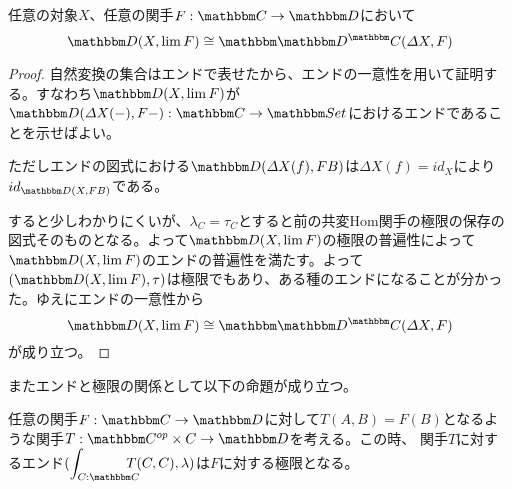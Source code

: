 \begin{prop}\label{prop-def-limit-by-arrowset}
  任意の対象$X$、任意の関手$\functor{F}{C}{D}$において\[\arset{D}{X}{\lim F}\cong\arset{\funccat{C}{D}}{\varDelta X}{F}\]
\end{prop}
\begin{proof}
  自然変換の集合はエンドで表せたから、エンドの一意性を用いて証明する。すなわち$\arset{D}{X}{\lim F}$が$\functor{\arset{D}{\varDelta X (-)}{F-}}{C}{Set}$におけるエンドであることを示せばよい。
  \begin{center}
  \end{center}
  ただしエンドの図式における$\arset{D}{\varDelta X(f)}{FB}$は$\varDelta X(f)=id_X$により$id_{\arset{D}{X}{FB}}$である。
  
  すると少しわかりにくいが、$\lambda_C=\tau_C$とすると前の共変Hom関手の極限の保存の図式そのものとなる。よって$\arset{D}{X}{\lim F}$の極限の普遍性によって$\arset{D}{X}{\lim F}$のエンドの普遍性を満たす。よって$(\arset{D}{X}{\lim F}, \tau)$は極限でもあり、ある種のエンドになることが分かった。ゆえにエンドの一意性から\[\arset{D}{X}{\lim F}\cong\arset{\funccat{C}{D}}{\varDelta X}{F}\]が成り立つ。
\end{proof}
またエンドと極限の関係として以下の命題が成り立つ。
\begin{prop}[エンドによる極限の定義]
  任意の関手$\functor{F}{C}{D}$に対して$T(A,B)=F(B)$となるような関手$\functor{T}{C^{op}\times C}{D}$を考える。この時、
  関手$T$に対するエンド$(\cend{C}{C}T(C,C),\lambda)$は$F$に対する極限となる。
\end{prop}
